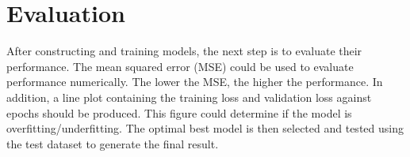 \documentclass[12pt,twoside]{report}
\begin{document}
\section{Evaluation}
After constructing and training models, the next step is to evaluate their performance. The mean squared error (MSE) could be used to evaluate performance numerically. The lower the MSE, the higher the performance. In addition, a line plot containing the training loss and validation loss against epochs should be produced. This figure could determine if the model is overfitting/underfitting. The optimal best model is then selected and tested using the test dataset to generate the final result. 








\end{document}
